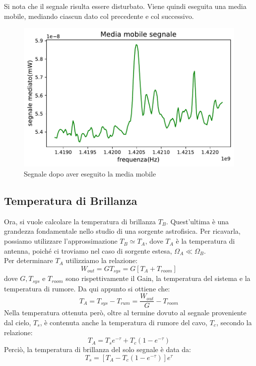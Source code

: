 Si nota che il segnale risulta essere disturbato. Viene quindi eseguita una media mobile, mediando ciascun dato col precedente e col successivo.

\begin{figure}[H]
	\centering
	\includegraphics[scale=0.8]{Media_mobile_segnale.pdf}
	\caption{Segnale dopo aver eseguito la media mobile}
    	\label{fig:Media_mobile_segnale}
\end{figure}


\subsection{Temperatura di Brillanza}

Ora, si vuole calcolare la temperatura di brillanza $T_{B}$. Quest'ultima è una grandezza fondamentale nello studio di una sorgente astrofisica. Per ricavarla, possiamo utilizzare l'approssimazione $T_{B} \simeq T_{A}$, dove $T_{A}$ è la temperatura di antenna, poiché ci troviamo nel caso di sorgente estesa, $\Omega_{A} \ll \Omega_{B}$.\\
Per determinare $T_{A}$ utilizziamo la relazione:
\begin{equation}
    W_{out}=GT_{sys}=G[T_{A}+T_{room}]
\end{equation}
dove $G, T_{sys}$ e $T_{room}$ sono rispettivamente il Gain, la temperatura del sistema e la temperatura di rumore.
Da qui appunto si ottiene che:
\begin{equation}
    T_{A}=T_{sys}-T_{rum}=\frac{W_{out}}{G}-T_{room} 
\label{temp antenna}
\end{equation}
Nella temperatura ottenuta però, oltre al termine dovuto al segnale proveniente dal cielo, $T_{s}$, è contenuta anche la temperatura di rumore del cavo, $T_{c}$, secondo la relazione:
\begin{equation}
    T_{A}=T_{s}e^{-\tau}+T_{c}(1-e^{-\tau})
\end{equation}
Perciò, la temperatura di brillanza del solo segnale è data da:
\begin{equation}
    T_{s}=[T_{A}-T_{c}(1-e^{-\tau})]e^{\tau}
\label{temp cielo}
\end{equation}

